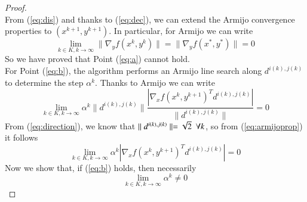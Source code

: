 \begin{proof}
\begin{equation}
\end{equation}
From (\ref{eq:dis}) and thanks to (\ref{eq:dec}), we can extend the Armijo convergence properties to $(x^{k+1}, y^{k+1})$. In particular, for Armijo we can write
\begin{equation}
\lim_{k \in K, k \rightarrow \infty} \parallel \nabla_y f(x^{k}, y^{k}) \parallel =  \parallel \nabla_y f(x^{*}, y^{*}) \parallel = 0
\end{equation}
So we have proved that Point (\ref{eq:a}) cannot hold.\\
For Point (\ref{eq:b}), the algorithm performs an Armijo line search along $d^{i(k),j(k)}$ to determine the step $\alpha^{k}$. Thanks to Armijo we can write
\begin{equation}\label{eq:armijoprop}
\lim_{k \in K, k \rightarrow \infty} \alpha^{k} \parallel d^{i(k),j(k)} \parallel \frac{ \left| \nabla_x f(x^{k}, y^{k+1})^T d^{i(k),j(k)} \right|}{\parallel d^{i(k),j(k)} \parallel} = 0
\end{equation}
From (\ref{eq:direction}), we know that $\parallel d^{i(k),j(k)} \parallel = \sqrt{2} \enskip\forall k$, so from (\ref{eq:armijoprop}) it follows
\begin{equation}
\lim_{k \in K, k \rightarrow \infty} \alpha^{k}  \left| \nabla_x f(x^{k}, y^{k+1})^T d^{i(k),j(k)} \right| = 0
\end{equation}
Now we show that, if (\ref{eq:b}) holds, then necessarily
\begin{equation}
\lim_{k \in K, k \rightarrow \infty} \alpha^k \neq 0
\end{equation}
\end{proof}